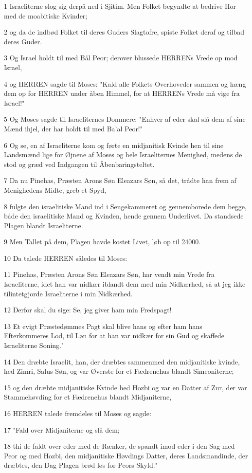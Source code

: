 \par 1 Israeliterne slog sig derpå ned i Sjitim. Men Folket begyndte at bedrive Hor med de moabitiske Kvinder;
\par 2 og da de indbød Folket til deres Guders Slagtofre, spiste Folket deraf og tilbad deres Guder.
\par 3 Og Israel holdt til med Bål Peor; derover blussede HERRENs Vrede op mod Israel,
\par 4 og HERREN sagde til Moses: "Kald alle Folkets Overhoveder sammen og hæng dem op for HERREN under åben Himmel, for at HERRENs Vrede må vige fra Israel!"
\par 5 Og Moses sagde til Israeliternes Dommere: "Enhver af eder skal slå dem af sine Mænd ihjel, der har holdt til med Ba'al Peor!"
\par 6 Og se, en af Israeliterne kom og førte en midjanitisk Kvinde hen til sine Landsmænd lige for Øjnene af Moses og hele Israeliternes Menighed, medens de stod og græd ved Indgangen til Åbenbaringsteltet.
\par 7 Da nu Pinehas, Præsten Arons Søn Eleazars Søn, så det, trådte han frem af Menighedens Midte, greb et Spyd,
\par 8 fulgte den israelitiske Mand ind i Sengekammeret og gennemborede dem begge, både den israelitiske Mand og Kvinden, hende gennem Underlivet. Da standsede Plagen blandt Israeliterne.
\par 9 Men Tallet på dem, Plagen havde kostet Livet, løb op til 24000.
\par 10 Da talede HERREN således til Moses:
\par 11 Pinehas, Præsten Arons Søn Eleazars Søn, har vendt min Vrede fra Israeliterne, idet han var nidkær iblandt dem med min Nidkærhed, så at jeg ikke tilintetgjorde Israeliterne i min Nidkærhed.
\par 12 Derfor skal du sige: Se, jeg giver ham min Fredspagt!
\par 13 Et evigt Præstedømmes Pagt skal blive hans og efter ham hans Efterkommeres Lod, til Løn for at han var nidkær for sin Gud og skaffede Israeliterne Soning."
\par 14 Den dræbte Israelit, han, der dræbtes sammenmed den midjanitiske kvinde, hed Zimri, Salus Søn, og var Øverste for et Fædrenehus blandt Simeoniterne;
\par 15 og den dræbte midjanitiske Kvinde hed Hozbi og var en Datter af Zur, der var Stammehøvding for et Fædrenehus blandt Midjaniterne,
\par 16 HERREN talede fremdeles til Moses og sagde:
\par 17 "Fald over Midjaniterne og slå dem;
\par 18 thi de faldt over eder med de Rænker, de spandt imod eder i den Sag med Peor og med Hozbi, den midjanitiske Høvdings Datter, deres Landsmandinde, der dræbtes, den Dag Plagen brød løs for Peors Skyld."

